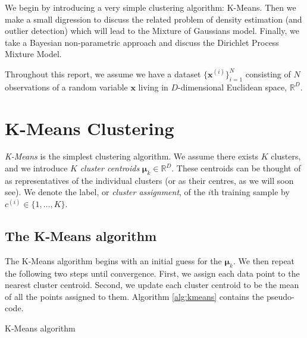 \documentclass[final,3p,times,twocolumn]{elsarticle}
\DeclareMathOperator*{\argmin}{arg\,min}
\begin{document}
We begin by introducing a very simple clustering algorithm: K-Means. 
Then we make a small digression to discuss the related problem of density estimation (and outlier detection) which will lead to the Mixture of Gaussians model.
Finally, we take a Bayesian non-parametric approach and discuss the Dirichlet Process Mixture Model.

Throughout this report, we assume we have a dataset $\{\boldsymbol x^{(i)}\}_{i=1}^N$ consisting of $N$ observations of a random variable $\boldsymbol x$ living in $D$-dimensional Euclidean space, $\mathbb{R}^D$.
 




\section{K-Means Clustering}
\emph{K-Means} is the simplest clustering algorithm.
We assume there exists $K$ clusters, and we introduce $K$ \emph{cluster centroids} $\boldsymbol \mu_k \in \mathbb{R}^D$.
These centroids can be thought of as representatives of the individual clusters (or as their centres, as we will soon see).
We denote the label, or \emph{cluster assignment}, of the $i$th training sample by $c^{(i)} \in \{1, \dots, K\}$. 

\subsection{The K-Means algorithm}

The K-Means algorithm begins with an initial guess for the $\boldsymbol \mu_k$. 
We then repeat the following two steps until convergence.
First, we assign each data point to the nearest cluster centroid.
Second, we update each cluster centroid to be the mean of all the points assigned to them.
Algorithm \ref{alg:kmeans} contains the pseudo-code.

\begin{algorithm}
\caption{K-Means algorithm}
\label{alg:kmeans}
\begin{algorithmic}[1]
\Repeat
{}\Comment
\State{$c^{(i)} = \argmin_k ||\boldsymbol{x}_i - \boldsymbol{k}_k||^2$}
\EndFor
{}
\EndFor
{}
\EndProcedure \\
\end{algorithmic}
\end{algorithm}
\end{document}
